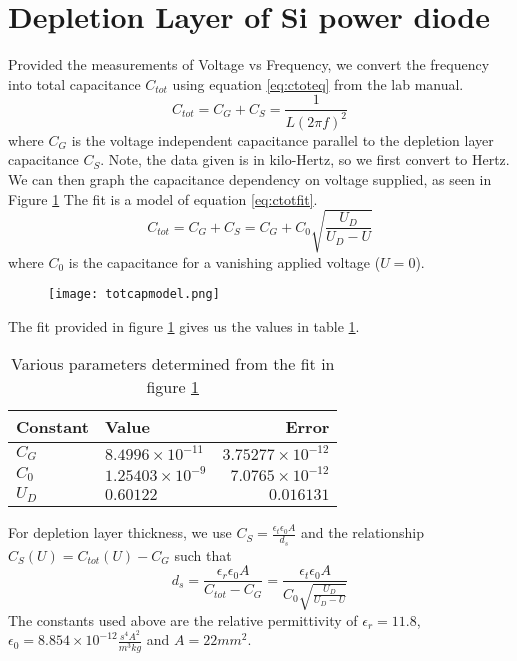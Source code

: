 \documentclass{article}
\begin{document}
\section{Depletion Layer of Si power diode}
Provided the measurements of Voltage vs Frequency, we convert the frequency into total capacitance $C_{tot}$ using equation \ref{eq:ctoteq} from the lab manual.
\begin{equation}
    C_{tot} = C_G + C_S = \frac{1}{L (2\pi f)^2}
    \label{eq:ctoteq}
\end{equation} where $C_G$ is the voltage independent capacitance parallel to the depletion layer capacitance $C_S$.
Note, the data given is in kilo-Hertz, so we first convert to Hertz.
We can then graph the capacitance dependency on voltage supplied, as seen in Figure \ref{fig:totcapmodel}
The fit is a model of equation \ref{eq:ctotfit}.
\begin{equation}
    C_{tot} = C_G + C_S = C_G + C_0 \sqrt{\frac{U_D}{U_D - U}}
    \label{eq:ctotfit}
\end{equation}
where $C_0$ is the capacitance for a vanishing applied voltage ($U = 0$).
\begin{figure}
    \centering
    \texttt{[image: totcapmodel.png]}
    \caption{}
    \label{fig:totcapmodel}
\end{figure}
The fit provided in figure \ref{fig:totcapmodel} gives us the values in table \ref{tab:task3tab}.
\begin{table}[h]
    \centering
    \begin{tabular}{l | l r}
        Constant & Value & Error \\
        \hline
        $C_G$ & $8.4996 \times 10^{-11}$ & $3.75277 \times 10^{-12}$\\
        $C_0$ & $1.25403 \times 10^{-9}$ & $7.0765 \times 10^{-12}$\\
        $U_D$  & $0.60122$ & $0.016131$
    \end{tabular}
    \caption{Various parameters determined from the fit in figure \ref{fig:totcapmodel}}
    \label{tab:task3tab}
\end{table}
For depletion layer thickness, we use $C_S = \frac{\epsilon_t \epsilon_0 A}{d_s} $ and the relationship $C_S(U) = C_{tot}(U) - C_G$ such that
\begin{equation}
    d_s = \frac{\epsilon_r \epsilon_0 A}{C_{tot} - C_G} = \frac{\epsilon_t \epsilon_0 A}{C_0 \sqrt{\frac{U_D}{U_D - U}}}
    \label{eq:depeq}
\end{equation}
The constants used above are the relative permittivity of $\epsilon_r = 11.8$, $\epsilon_0 = 8.854 \times 10^{-12} \frac{s^4 A^2}{m^{3} kg}$ and $A = 22 mm^2$.
\end{document}
